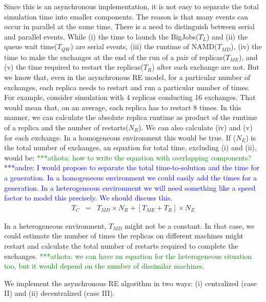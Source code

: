 \documentclass{rspublic}
\newcommand{\alnote}[1]{ {\textcolor{blue} { ***andre: #1 }}}
\newcommand{\athotanote}[1]{ {\textcolor{green} { ***athota: #1 }}}
\newcommand{\alnote}[1]{}
\newcommand{\athotanote}[1]{}
\begin{document}
Since this is an asynchronous implementation, it is not easy to separate the total simulation time into smaller components. The reason is that many events can occur in parallel at the same time. There is a need to distinguish between serial and parallel events. While (i) the time to launch the BigJobs($T_{L}$) and (ii) the queue wait time($T_{QW}$) are serial events, (iii) the runtime of NAMD($T_{MD}$), (iv) the time to make the exchanges at the end of the run of a pair of replicas($T_{ME}$), and (v) the time required to restart the replicas($T_{R}$) after each exchange are not. But we know that, even in the asynchronous RE model, for a particular number of exchanges, each replica needs to restart and run a particular number of times. For example, consider simulation with 4 replicas conducting 16 exchanges. That would mean that, on an average, each replica has to restart 8 times. In this manner, we can calculate the absolute replica runtime as product of the runtime of a replica and the number of restarts($N_{R}$). We can also calculate (iv) and (v) for each exchange. In a homogeneous environment this would be true. 
If ($N_{E}$) is the total number of exchanges, an equation for total time, excluding (i) and (ii), would be:
\athotanote{how to write the equation with overlapping components?}
\alnote{I would propose to separate the total time-to-solution and the time for a generation. 
In a homogeneous environment we could easily add the times for a generation. In a heterogeneous 
environment we will need something like a speed factor to model this precisely. We should discuss this.}
  \begin{eqnarray}
T_{C} &=& T_{MD} \times N_{R} + [T_{ME} + T_{R}] \times N_{E}
\label{eq:equation 1}
\end{eqnarray}

In a heterogeneous environment, $T_{MD}$ might not be a constant. In that case, we could estimate the number of times the replicas on different machines might restart and calculate the total number of restarts required to complete the exchanges. \athotanote{we can have an equation for the heterogeneous situation too, but it would depend on the number of dissimilar machines.}

We implement the asynchronous RE algorithm in two ways: (i) centralized (case II) and (ii) decentralized (case III).
\end{document}
